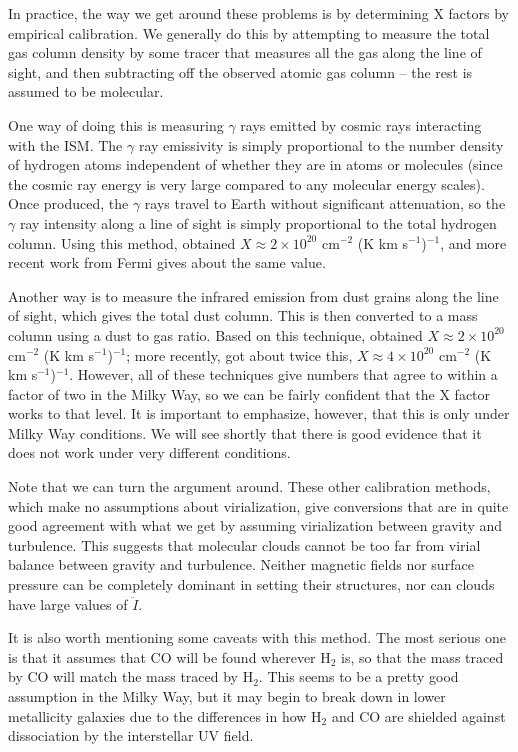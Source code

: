 In practice, the way we get around these problems is by determining X factors by empirical calibration. We generally do this by attempting to measure the total gas column density by some tracer that measures all the gas along the line of sight, and then subtracting off the observed atomic gas column -- the rest is assumed to be molecular.

One way of doing this is measuring $\gamma$ rays emitted by cosmic rays interacting with the ISM. The $\gamma$ ray emissivity is simply proportional to the number density of hydrogen atoms independent of whether they are in atoms or molecules (since the cosmic ray energy is very large compared to any molecular energy scales). Once produced, the $\gamma$ rays travel to Earth without significant attenuation, so the $\gamma$ ray intensity along a line of sight is simply proportional to the total hydrogen column. Using this method, \citet{strong96a} obtained $X \approx 2\times 10^{20}$ cm$^{-2}$ (K km s$^{-1}$)$^{-1}$, and more recent work from Fermi \citep{abdo10b} gives about the same value.

Another way is to measure the infrared emission from dust grains along the line of sight, which gives the total dust column. This is then converted to a mass column using a dust to gas ratio. Based on this technique, \citet{dame01a} obtained $X\approx 2 \times 10^{20}$ cm$^{-2}$ (K km s$^{-1}$)$^{-1}$; more recently, \citet{draine07a} got about twice this, $X\approx 4 \times 10^{20}$ cm$^{-2}$ (K km s$^{-1}$)$^{-1}$. However, all of these techniques give numbers that agree to within a factor of two in the Milky Way, so we can be fairly confident that the X factor works to that level. It is important to emphasize, however, that this is only under Milky Way conditions. We will see shortly that there is good evidence that it does not work under very different conditions.

Note that we can turn the argument around. These other calibration methods, which make no assumptions about virialization, give conversions that are in quite good agreement with what we get by assuming virialization between gravity and turbulence. This suggests that molecular clouds cannot be too far from virial balance between gravity and turbulence. Neither magnetic fields nor surface pressure can be completely dominant in setting their structures, nor can clouds have large values of $\ddot{I}$.

It is also worth mentioning some caveats with this method. The most serious one is that it assumes that CO will be found wherever H$_2$ is, so that the mass traced by CO will match the mass traced by H$_2$. This seems to be a pretty good assumption in the Milky Way, but it may begin to break down in lower metallicity galaxies due to the differences in how H$_2$ and CO are shielded against dissociation by the interstellar UV field.

